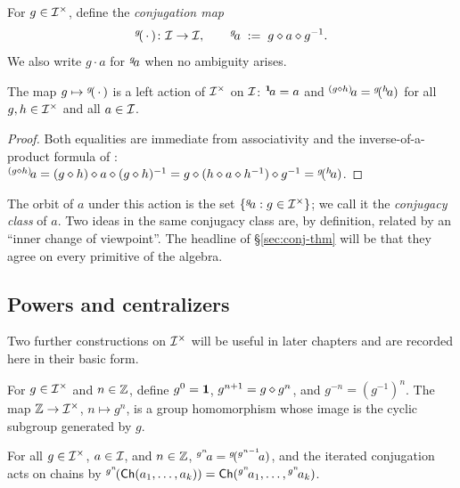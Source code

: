 \begin{definition}\label{def:inner-action}
For $g\in\mathcal{I}^{\times}$, define the \emph{conjugation map}
\[
  {}^{g}\!(\,\cdot\,) \colon \mathcal{I} \to \mathcal{I},
  \qquad
  {}^{g}\!a \;\mathrel{:=}\; g\mathbin{\diamond} a\mathbin{\diamond} g^{-1}.
\]
We also write $g\cdot a$ for ${}^{g}\!a$ when no ambiguity arises.
\end{definition}

\begin{lemma}\label{lem:inner-action}
The map $g\mapsto {}^{g}\!(\,\cdot\,)$ is a left action of
$\mathcal{I}^{\times}$ on $\mathcal{I}$: ${}^{\mathbf{1}}\!a = a$ and
${}^{(g\mathbin{\diamond} h)}\!a = {}^{g}\!({}^{h}\!a)$ for all
$g,h\in\mathcal{I}^{\times}$ and all $a\in\mathcal{I}$.
\end{lemma}

\begin{proof}
Both equalities are immediate from associativity and the inverse-of-a-product
formula of : ${}^{(g\mathbin{\diamond} h)}\!a = (g\mathbin{\diamond}
h)\mathbin{\diamond} a\mathbin{\diamond} (g\mathbin{\diamond} h)^{-1} = g\mathbin{\diamond}(h\mathbin{\diamond} a\mathbin{\diamond}
h^{-1})\mathbin{\diamond} g^{-1} = {}^{g}\!({}^{h}\!a)$.
\end{proof}

The orbit of $a$ under this action is the set $\{{}^{g}\!a :
g\in\mathcal{I}^{\times}\}$; we call it the \emph{conjugacy class} of $a$.
Two ideas in the same conjugacy class are, by definition, related by an
``inner change of viewpoint''. The headline of \S\ref{sec:conj-thm}
will be that they agree on every primitive of the algebra.

\subsection*{Powers and centralizers}

Two further constructions on $\mathcal{I}^{\times}$ will be useful in
later chapters and are recorded here in their basic form.

\begin{definition}[Powers]\label{def:powers}
For $g\in\mathcal{I}^{\times}$ and $n\in\mathbb{Z}$, define $g^{0}=\mathbf{1}$,
$g^{n+1} = g\mathbin{\diamond} g^n$, and $g^{-n} = (g^{-1})^n$. The map $\mathbb{Z}\to
\mathcal{I}^{\times}$, $n\mapsto g^n$, is a group homomorphism whose
image is the cyclic subgroup generated by $g$.
\end{definition}

\begin{lemma}\label{lem:pow-conj}
For all $g\in\mathcal{I}^{\times}$, $a\in\mathcal{I}$, and $n\in\mathbb{Z}$,
${}^{g^n}\!a = {}^{g}\!({}^{g^{n-1}}\!a)$, and the iterated
conjugation acts on chains by
${}^{g^n}\!(\mathsf{Ch}(a_1,\dots,a_k))
= \mathsf{Ch}({}^{g^n}\!a_1,\dots,{}^{g^n}\!a_k)$.
\end{lemma}

